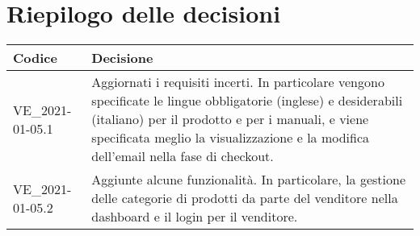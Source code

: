 \section{Riepilogo delle decisioni}
\setcounter{table}{-1}
{
\centering
\renewcommand{\arraystretch}{1.5}
\begin{longtable}{>{\centering}p{} >{}p{}}
\rowcolor{azzurro1}
\textbf{Codice} &
\centerline{\textbf{Decisione}}\\
\endhead

VE{\_}2021-01-05.1 & Aggiornati i requisiti incerti. In particolare vengono specificate le lingue obbligatorie (inglese) e desiderabili (italiano) per il prodotto e per i manuali, e viene specificata meglio la visualizzazione e la modifica dell'email nella fase di checkout. \\
VE{\_}2021-01-05.2 & Aggiunte alcune funzionalità. In particolare, la gestione delle categorie di prodotti da parte del venditore nella dashboard e il login per il venditore.\\
\end{longtable}
}